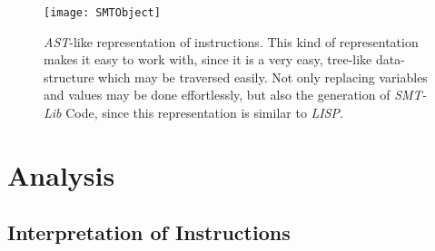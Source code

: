 \begin{figure}[h!]
	\centering
	\texttt{[image: SMTObject]}
	\caption{\emph{AST}-like representation of instructions. This kind of representation makes it easy to work with, since it is a very easy, tree-like data-structure which may be traversed easily. Not only replacing variables and values may be done effortlessly, but also the generation of \emph{SMT-Lib} Code, since this representation is similar to \emph{LISP}.}
	\label{fig:smtobject}
\end{figure}
\section{Analysis}
\label{sec:analysis}


\subsection{Interpretation of Instructions}
% 